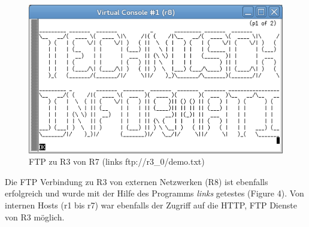 \documentclass[a4paper,10pt]{article}
\begin{document}
\begin{figure}[h]
  \centering\includegraphics[scale=.5]{ftp_r8_to_r3.png}
  \caption{FTP zu R3 von R7 (links ftp://r3\_0/demo.txt)}
\end{figure}
Die FTP Verbindung zu R3 von externen Netzwerken (R8) ist ebenfalls erfolgreich und wurde mit der Hilfe des Programms \textit{links} getestes (Figure 4).
Von internen Hosts (r1 bis r7) war ebenfalls der Zugriff auf die HTTP, FTP Dienste von R3 möglich.
\end{document}

